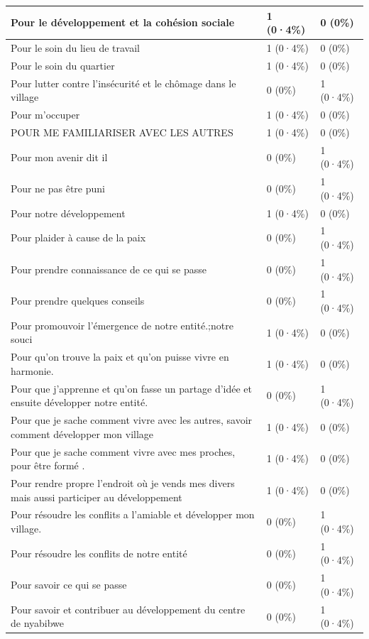\documentclass[
]{book}
\begin{document}
\begin{tabular}{l|l|l}
\hline
Pour le développement et la cohésion sociale & 1 (0·4\%) & 0 (0\%)\\
\hline
Pour le soin du lieu de travail & 1 (0·4\%) & 0 (0\%)\\
\hline
Pour le soin du quartier & 1 (0·4\%) & 0 (0\%)\\
\hline
Pour lutter contre l'insécurité et le chômage dans le village & 0 (0\%) & 1 (0·4\%)\\
\hline
Pour m'occuper & 1 (0·4\%) & 0 (0\%)\\
\hline
POUR ME FAMILIARISER AVEC LES AUTRES & 1 (0·4\%) & 0 (0\%)\\
\hline
Pour mon avenir dit il & 0 (0\%) & 1 (0·4\%)\\
\hline
Pour ne pas être puni & 0 (0\%) & 1 (0·4\%)\\
\hline
Pour notre développement & 1 (0·4\%) & 0 (0\%)\\
\hline
Pour plaider à cause de la paix & 0 (0\%) & 1 (0·4\%)\\
\hline
Pour prendre connaissance de ce qui se passe & 0 (0\%) & 1 (0·4\%)\\
\hline
Pour prendre quelques conseils & 0 (0\%) & 1 (0·4\%)\\
\hline
Pour promouvoir l'émergence de notre entité.;notre souci & 1 (0·4\%) & 0 (0\%)\\
\hline
Pour qu'on trouve la paix et qu'on puisse vivre en harmonie. & 1 (0·4\%) & 0 (0\%)\\
\hline
Pour que j'apprenne et qu'on fasse un partage d'idée et ensuite développer notre entité. & 0 (0\%) & 1 (0·4\%)\\
\hline
Pour que je sache comment vivre avec les autres, savoir comment développer mon village & 1 (0·4\%) & 0 (0\%)\\
\hline
Pour que je sache comment vivre avec mes proches, pour être formé . & 1 (0·4\%) & 0 (0\%)\\
\hline
Pour rendre propre l'endroit où je vends mes divers mais aussi participer au développement & 1 (0·4\%) & 0 (0\%)\\
\hline
Pour résoudre les conflits a l'amiable et développer mon village. & 0 (0\%) & 1 (0·4\%)\\
\hline
Pour résoudre les conflits de notre entité & 0 (0\%) & 1 (0·4\%)\\
\hline
Pour savoir ce qui se passe & 0 (0\%) & 1 (0·4\%)\\
\hline
Pour savoir et contribuer au développement du centre de nyabibwe & 0 (0\%) & 1 (0·4\%)\\

\end{tabular}
\end{document}
